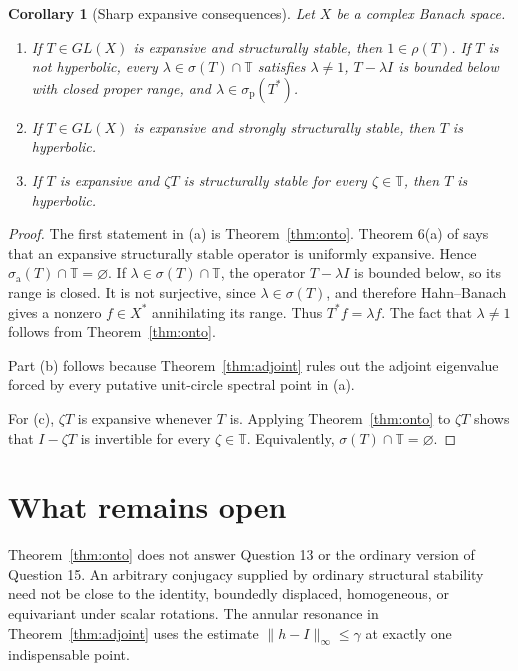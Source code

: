 \documentclass[11pt]{article}
\newtheorem{corollary}[theorem]{Corollary}
\newcommand{\Torus}{\mathbb T}
\newcommand{\spa}{\sigma_{\mathrm p}}
\newcommand{\saa}{\sigma_{\mathrm a}}
\newcommand{\rhoop}{\rho}
\begin{document}
\begin{corollary}[Sharp expansive consequences]\label{cor:expansive}
Let $X$ be a complex Banach space.
\begin{enumerate}[label=(\alph*)]
\item If $T\in GL(X)$ is expansive and structurally stable, then
      $1\in\rhoop(T)$. If $T$ is not hyperbolic, every
      $\lambda\in\sigma(T)\cap\Torus$ satisfies $\lambda\neq1$,
      $T-\lambda I$ is bounded below with closed proper range, and
      $\lambda\in\spa(T^*)$.
\item If $T\in GL(X)$ is expansive and strongly structurally stable, then $T$ is
      hyperbolic.
\item If $T$ is expansive and $\zeta T$ is structurally stable for every
      $\zeta\in\Torus$, then $T$ is hyperbolic.
\end{enumerate}
\end{corollary}

\begin{proof}
The first statement in (a) is Theorem~\ref{thm:onto}. Theorem 6(a) of \cite{BM19}
says that an expansive structurally stable operator is uniformly expansive. Hence
$\saa(T)\cap\Torus=\varnothing$. If
$\lambda\in\sigma(T)\cap\Torus$, the operator $T-\lambda I$ is bounded below,
so its range is closed. It is not surjective, since $\lambda\in\sigma(T)$, and therefore
Hahn--Banach gives a nonzero $f\in X^*$ annihilating its range. Thus
$T^*f=\lambda f$. The fact that $\lambda\neq1$ follows from Theorem~\ref{thm:onto}.

Part (b) follows because Theorem~\ref{thm:adjoint} rules out the adjoint eigenvalue
forced by every putative unit-circle spectral point in (a).

For (c), $\zeta T$ is expansive whenever $T$ is. Applying
Theorem~\ref{thm:onto} to $\zeta T$ shows that $I-\zeta T$ is invertible for every
$\zeta\in\Torus$. Equivalently, $\sigma(T)\cap\Torus=\varnothing$.
\end{proof}

\section{What remains open}

Theorem~\ref{thm:onto} does not answer Question 13 or the ordinary version of
Question 15. An arbitrary conjugacy supplied by ordinary structural stability need not
be close to the identity, boundedly displaced, homogeneous, or equivariant under scalar
rotations. The annular resonance in Theorem~\ref{thm:adjoint} uses the estimate
$\|h-I\|_\infty\leq\gamma$ at exactly one indispensable point.
\end{document}
